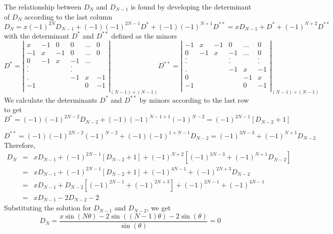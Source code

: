 \documentclass{report}
\begin{document}
The relationship between $D_N$ and $D_{N-1}$ is found by developing the determinant of $D_N$ according to the last column
\begin{equation*}
D_N = x(-1)^{2N}D_{N-1}+(-1)(-1)^{2N-1}D^*+(-1)(-1)^{N+1}D^{**}=xD_{N-1}+D^*+(-1)^{N+2}D^{**}
\end{equation*}
with the determinant $D^*$ and $D^{**}$ defined as the minors 
\begin{equation*}
D^*= 
\left| \begin{matrix}
 x  & -1 &  0 &  0  &... &  0 \\
-1  &  x & -1 &  0  &... &  0 \\
 0  & -1 &  x & -1  &... &    \\
 .  &    &    &  .  &    &    \\
 .  &    &    &  .  &    &    \\
 .  &    &    &  -1 &  x &-1  \\
 -1 &    &    &     &  0 &-1  \\   
\end{matrix}\right|_{(N-1)\times(N-1)} 
D^{**}=\left|\begin{matrix}
-1  &  x & -1 &  0  &...&  0 \\
 0  & -1 &  x & -1  &...&  0 \\
 .  &    &    &  .  &   &  . \\
 .  &    &    &  .  &   &  . \\
 .  &    &    &  -1 &  x& -1 \\
 0  &    &    &     & -1& x  \\
 -1 &    &    &     &  0&-1  \\   
\end{matrix} \right|_{(N-1)\times(N-1)}
\end{equation*}
We calculate the determinants $D^*$ and $D^{**}$ by minors according to the last row to get 
\begin{equation*}
D^* = (-1)(-1)^{2N-2}D_{N-2}+(-1)(-1)^{N-1+1}(-1)^{N-2}=(-1)^{2N-1}[D_{N-2}+1]
\end{equation*}

\begin{equation*}
D^{**}=(-1)(-1)^{2N-2}(-1)^{N-2} +(-1)(-1)^{1+N-1}D_{N-2}=(-1)^{3N-3}+(-1)^{N+1}D_{N-2}
\end{equation*}
Therefore, 
\begin{eqnarray*}
D_N & = & xD_{N-1} + (-1)^{2N-1}[D_{N-2}+1]+(-1)^{N+2}[(-1)^{3N-3}+(-1)^{N+1}D_{N-2}]\\
    & = & xD_{N-1} + (-1)^{2N-1}[D_{N-2}+1]+(-1)^{4N-1}+(-1)^{2N+3}D_{N-2}\\
    & = & xD_{N-1} + D_{N-2}[(-1)^{2N-1}+(-1)^{2N+3}]+(-1)^{2N-1}+(-1)^{4N-1}\\
    & = & xD_{N-1} - 2D_{N-2}-2
\end{eqnarray*}
Substituting the solution for $D_{N-1}$ and $D_{N-2}$, we get 
\begin{equation*}
D_N = \frac{x\sin(N\theta)-2\sin((N-1)\theta)-2\sin(\theta)}{\sin(\theta)}=0
\end{equation*}
\end{document}
